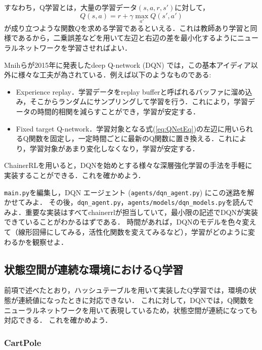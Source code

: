   すなわち，Q学習とは，大量の学習データ$(s, a, r, s')$に対して，
  \begin{equation}
   \label{eq:QNetEq}
   Q(s, a) = r + \gamma \max_{a'} Q(s', a')
  \end{equation}
  が成り立つような関数$Q$を求める学習であるといえる．これは教師あり学習と同様であるから，二乗誤差などを用いて左辺と右辺の差を最小化するようにニューラルネットワークを学習させればよい．

  Mnihらが2015年に発表したdeep Q-network (DQN) では，この基本アイディア以外に様々な工夫が為されている．例えば以下のようなものである:
  \begin{itemize}
   \item Experience replay．学習データをreplay bufferと呼ばれるバッファに溜め込み，そこからランダムにサンプリングして学習を行う．これにより，学習データの時間的相関を減らすことができ，学習が安定する．
   \item Fixed target Q-network．学習対象となる式(\ref{eq:QNetEq})の左辺に用いられるQ関数を固定し，一定時間ごとに最新のQ関数に置き換える．これにより，学習対象があまり変化しなくなり，学習が安定する．
  \end{itemize}

  ChainerRLを用いると，DQNを始めとする様々な深層強化学習の手法を手軽に実装することができる．これを確かめよう．

  \begin{practice}
   \verb+main.py+を編集し，DQN エージェント (\verb+agents/dqn_agent.py+) にこの迷路を解かせてみよ．
   その後，\verb+dqn_agent.py+，\verb+agents/models/dqn_models.py+を読んでみよ．重要な実装はすべてchainerrlが担当していて，最小限の記述でDQNが実装できていることがわかるはずである．
   時間があれば，DQNのモデルを色々変えて（線形回帰にしてみる，活性化関数を変えてみるなど），学習がどのように変わるかを観察せよ．
  \end{practice}

  \subsection{状態空間が連続な環境におけるQ学習}

  前項で述べたとおり，ハッシュテーブルを用いて実装したQ学習では，環境の状態が連続値になったときに対応できない．
  これに対して，DQNでは，Q関数をニューラルネットワークを用いて表現しているため，状態空間が連続になっても対応できる．
  これを確かめよう．

  \subsubsection{CartPole}

